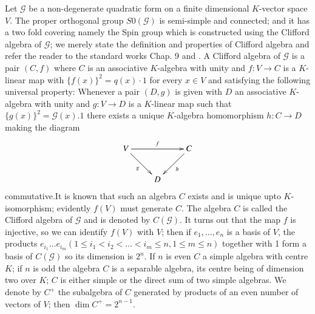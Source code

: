 \begin{exam}\label{chap2:exam2}%
Let $\mathscr{G}$  be a non-degenerate quadratic form on a finite
dimensional $K$-vector space $V$. The proper orthogonal group $S0
(\mathscr{G})$ is semi-simple and connected; and it has a two fold
covering namely the Spin group which is constructed using the Clifford
algebra of $\mathscr{G}$; we merely state the definition and
properties of Clifford  algebra and refer the reader to the standard
works  \cite{keyB}  Chap. 9 and \cite{keyC1}. A Clifford algebra of
$\mathscr{G}$ 
is a pair $(C,f)$ where $C$ is an associative $K$-algebra with
unity and $f:V \rightarrow C$ is a $K$-linear map with $\{f (x)\}^2 =
q (x) \cdot 1$ for every  $x \in V$ and satisfying the following universal
property: Whenever a pair $(D,g)$ is given with $D$ an associative
$K$-algebra with unity and  $g:V \rightarrow D$ is a $K$-linear map such
that $\{g(x)\}^2 =\mathscr{G} (x).1$ there exists a unique $K$-algebra
homomorphism $h: C \rightarrow D$ making the diagram 
\[
\xymatrix{
V \ar[rr]^f \ar[dr]_g & & C \ar[dl]^h \\
& D & 
}
\]
commutative.\pageoriginale It is known that such an algebra $C$ exists
and is unique upto $K$-isomorphism; evidently $f(V)$ must generate
$C$. The algebra $C$ is called the Clifford algebra of $\mathscr{G}$
and is denoted by $C (\mathscr{G})$. It turns out that the map $f$ is
injective, so we can identify $f(V)$ with $V$; then if $e_1,\ldots,
e_n$ is a basis of 
$V$, the products $e_{i_{1}} \ldots e_{i_{m}} (1 \leq i_1 < i_2 <
\ldots < i_m \leq n, 1 \leq m \leq n)$ together with 1 form a basis
of $C(\mathscr{G})$ so its dimension is $2^n$. If $n$ is even $C$ a
simple algebra  with centre $K$; if $n$ is odd the algebra $C$ is a
separable algebra, its centre being of dimension two over $K$; $C$ is
either simple or the direct sum of two simple algebras. We denote by
$C^+$ the subalgebra of $C$ generated by products of an even number
of vectors of $V$; then $\dim C^+ = 2^{n-1}$.  
\end{exam}

